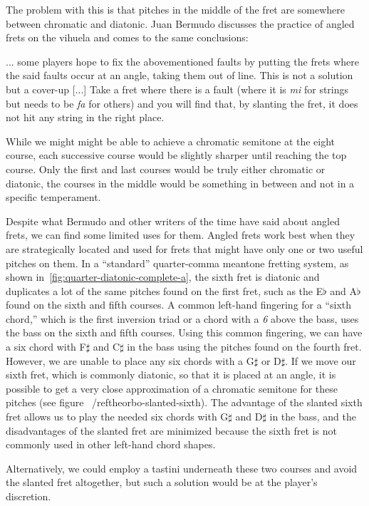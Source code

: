 The problem with this is that pitches in the middle of the fret are somewhere between
chromatic and diatonic.  Juan Bermudo discusses the practice of angled frets on the
vihuela and comes to the same conclusions:
\begin{blocks}
... some players hope to fix the abovementioned faults by putting the frets where the said
faults occur at an angle, taking them out of line. This is not a solution but a cover-up
[...] Take a fret where there is a fault (where it is \textit{mi} for strings but needs to
be \textit{fa} for others) and you will find that, by slanting the fret, it does not hit
any string in the right place. \autocite[112-113]{DE:1}
\end{blocks}
While we might might be able to achieve a chromatic semitone at the eight course, each
successive course would be slightly sharper until reaching the top course.  Only the
first and last courses would be truly either chromatic or diatonic, the courses in the
middle would be something in between and not in a specific temperament.

Despite what Bermudo and other writers of the time have said about angled frets, we can
find some limited uses for them.  Angled frets work best when they are strategically
located and used for frets that might have only one or two useful pitches on them. In a
``standard'' quarter-comma meantone fretting system, as shown
in~\ref{fig:quarter-diatonic-complete-a}, the sixth fret is diatonic and duplicates a lot of
the same pitches found on the first fret, such as the E$\flat$ and A$\flat$ found on the
sixth and fifth courses.  A common left-hand fingering for a ``sixth chord,'' which is the
first inversion triad or a chord with a \textit{6} above the bass, uses the bass on the
sixth and fifth courses. Using this common fingering, we can have a six chord with
F$\sharp$ and C$\sharp$ in the bass using the pitches found on the fourth fret.  However,
we are unable to place any six chords with a G$\sharp$ or D$\sharp$.  If we move our sixth
fret, which is commonly diatonic, so that it is placed at an angle, it is possible to get
a very close approximation of a chromatic semitone for these pitches (see figure
~/ref{theorbo-slanted-sixth}).  The advantage of the slanted sixth fret allows us to play
the needed six chords with G$\sharp$ and D$\sharp$ in the bass, and the disadvantages
of the slanted fret are minimized because the sixth fret is not commonly used in other
left-hand chord shapes.

Alternatively, we could employ a tastini underneath these two courses and avoid the
slanted fret altogether, but such a solution would be at the player's discretion.

